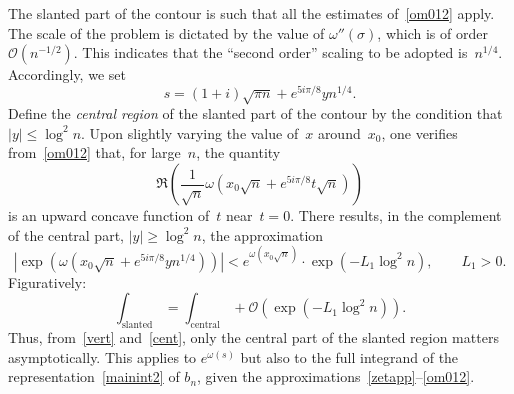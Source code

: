 \documentclass{amsart}
\begin{document}
The slanted part of
the contour is such that all the estimates of~\eqref{om012} apply. 
The scale of the problem is dictated by the value of $\omega''(\sigma)$,
 which is of order $\mathcal{O}(n^{-1/2})$. This indicates that the ``second order'' scaling 
to be adopted is~$n^{1/4}$. Accordingly, we set
\begin{equation}\label{cregion}
s=(1+i)\sqrt{\pi n}+e^{5i\pi/8}yn^{1/4}.
\end{equation}
Define the \emph{central region} of the slanted part of the contour by the condition
that $|y|\le \log^2 n$.
Upon slightly varying the value of~$x$ around~$x_0$, one verifies from~\eqref{om012} that,
for large~$n$, the quantity
\[
\Re\left(\frac{1}{\sqrt{n}}
\omega\left(x_0\sqrt{n}+e^{5i\pi/8}t\sqrt{n}\right)\right)
\]
is an upward concave function of~$t$ near~$t=0$. There results,
in the complement of the central part, $|y|\ge \log^2n$,
the approximation
\[
\left|\exp\left(\omega\left(x_0\sqrt{n}+e^{5i\pi/8}yn^{1/4}\right)\right)\right|
< e^{\omega(x_0\sqrt{n})}
\cdot \exp\left(-L_1 \log^2 n\right),\qquad L_1>0.
\]
Figuratively:
\begin{equation}\label{cent}
\int_{\operatorname{slanted}}=\int_{\operatorname{central}}+\mathcal{O}\left(\exp\left(-L_1 \log^2 n\right)\right).
\end{equation}
Thus, from~\eqref{vert}  and~\eqref{cent},  only the central   part of the
slanted region matters asymptotically. This applies to $e^{\omega(s)}$ but also
to the full integrand of the representation~\eqref{mainint2} of $b_n$,
given the approximations~\eqref{zetapp}--\eqref{om012}.

\smallskip
\end{document}
